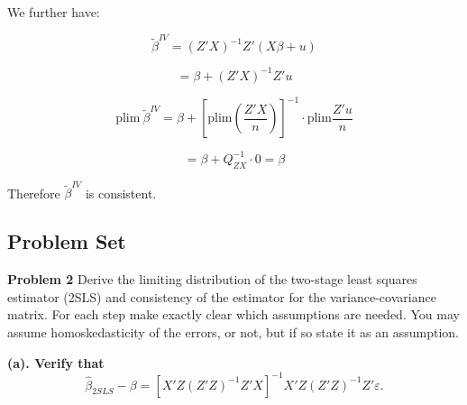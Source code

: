 \documentclass[12pt, oneside]{article}
\begin{document}
We further have:

\[
\tilde{\beta}^{IV} = (Z'X)^{-1}Z'(X\beta + u)
\]

\[
= \beta + (Z'X)^{-1}Z'u
\]

\[
\text{plim} \ \tilde{\beta}^{IV} = \beta + \left[ \text{plim} \left( \frac{Z'X}{n} \right) \right]^{-1} \cdot \text{plim} \frac{Z'u}{n}
\]

\[
= \beta + Q_{ZX}^{-1} \cdot 0 = \beta
\]

Therefore \( \tilde{\beta}^{IV} \) is consistent.


\subsection{Problem Set}

\textbf*{Problem 2}
Derive the limiting distribution of the two-stage least squares estimator (2SLS) and consistency of the estimator for the variance-covariance matrix. For each step make exactly clear which assumptions are needed. You may assume homoskedasticity of the errors, or not, but if so state it as an assumption.

\textbf{(a). Verify that}
\[
\hat{\beta}_{2SLS} - \beta = \left[ X'Z(Z'Z)^{-1}Z'X \right]^{-1} X'Z(Z'Z)^{-1}Z'\varepsilon.
\]
\end{document}
